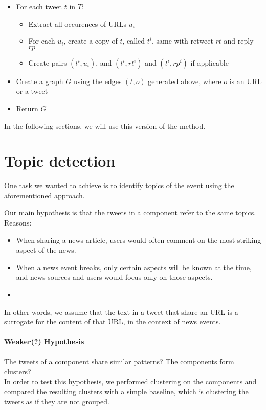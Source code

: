 \documentclass{article}
\begin{document}
\begin{itemize}
\item For each tweet $t$ in $T$:
  \begin{itemize}
  \item Extract all occurences of URLs $u_i$
  \item For each $u_i$, create a copy of $t$, called $t^i$, same with
    retweet $rt$ and reply $rp$
  \item Create pairs $(t^i, u_i)$, and $(t^i, rt^i)$ and $(t^i, rp^i)$
    if applicable
  \end{itemize}
\item Create a graph $G$ using the edges $(t, o)$ generated above,
  where $o$ is an URL or a tweet
\item Return $G$
\end{itemize}

In the following sections, we will use this version of the method.


\section{Topic detection}

One task we wanted to achieve is to identify topics of the event using
the aforementioned approach.

Our main hypothesis is that the tweets in a component refer to the
same topics. Reasons:

\begin{itemize}
\item When sharing a news article, users would often comment
  on the most striking aspect of the news.
\item When a news event breaks, only certain aspects will be known at
  the time, and news sources and users would focus only on those
  aspects.
\item 
\end{itemize}

In other words, we assume that the text in a tweet that share an URL
is a surrogate for the content of that URL, in the context of news
events.

\paragraph{Weaker(?) Hypothesis} The tweets of a component share similar
patterns? The components form clusters? \\

In order to test this hypothesis, we performed clustering on the
components and compared the resulting clusters with a simple baseline,
which is clustering the tweets as if they are not grouped.
\end{document}

